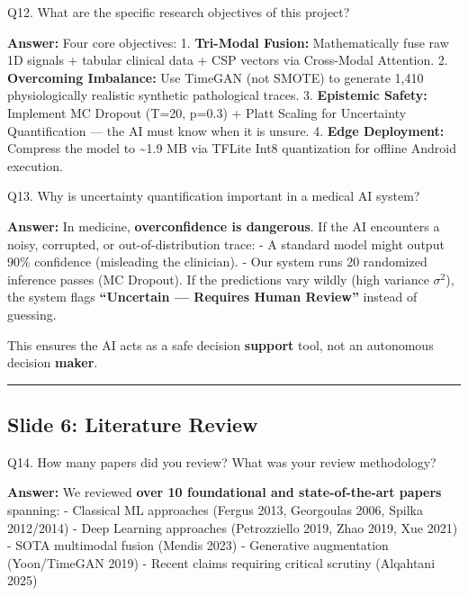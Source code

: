 \documentclass[11pt,a4paper]{article}
\begin{document}
\begin{questionbox}
Q12. What are the specific research objectives of this
project?
\end{questionbox}
\textbf{Answer:} Four core objectives: 1. \textbf{Tri-Modal Fusion:}
Mathematically fuse raw 1D signals + tabular clinical data + CSP vectors
via Cross-Modal Attention. 2. \textbf{Overcoming Imbalance:} Use TimeGAN
(not SMOTE) to generate 1,410 physiologically realistic synthetic
pathological traces. 3. \textbf{Epistemic Safety:} Implement MC Dropout
(T=20, p=0.3) + Platt Scaling for Uncertainty Quantification --- the AI
must know when it is unsure. 4. \textbf{Edge Deployment:} Compress the
model to \textasciitilde1.9 MB via TFLite Int8 quantization for offline
Android execution.

\begin{questionbox}
Q13. Why is uncertainty quantification important in a medical AI
system?
\end{questionbox}
\textbf{Answer:} In medicine, \textbf{overconfidence is dangerous}. If the AI
encounters a noisy, corrupted, or out-of-distribution trace: - A
standard model might output 90\% confidence (misleading the clinician).
- Our system runs 20 randomized inference passes (MC Dropout). If the
predictions vary wildly (high variance $\sigma$$^{2}$), the system flags
\textbf{``Uncertain --- Requires Human Review''} instead of guessing.

This ensures the AI acts as a safe decision \textbf{support} tool, not
an autonomous decision \textbf{maker}.

\begin{center}\rule{0.5\linewidth}{0.5pt}\end{center}

\subsection{Slide 6: Literature Review}\label{slide-6-literature-review}

\begin{questionbox}
Q14. How many papers did you review? What was your review
methodology?
\end{questionbox}
\textbf{Answer:} We reviewed \textbf{over 10 foundational and
state-of-the-art papers} spanning: - Classical ML approaches (Fergus
2013, Georgoulas 2006, Spilka 2012/2014) - Deep Learning approaches
(Petrozziello 2019, Zhao 2019, Xue 2021) - SOTA multimodal fusion
(Mendis 2023) - Generative augmentation (Yoon/TimeGAN 2019) - Recent
claims requiring critical scrutiny (Alqahtani 2025)
\end{document}
